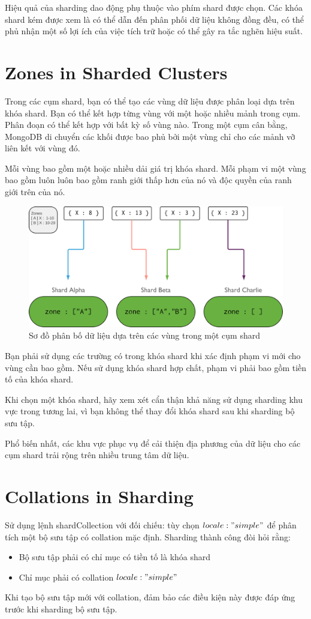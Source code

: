 Hiệu quả của sharding dao động phụ thuộc vào phím shard được chọn. Các khóa shard kém được xem là có thể dẫn đến phân phối dữ liệu không đồng đều, có thể phủ nhận một số lợi ích của việc tích trữ hoặc có thể gây ra tắc nghẽn hiệu suất.

\section{Zones in Sharded Clusters}
Trong các cụm shard, bạn có thể tạo các vùng dữ liệu được phân loại dựa trên khóa shard. Bạn có thể kết hợp từng vùng với một hoặc nhiều mảnh trong cụm. Phân đoạn có thể kết hợp với bất kỳ số vùng nào. Trong một cụm cân bằng, MongoDB di chuyển các khối được bao phủ bởi một vùng chỉ cho các mảnh vỡ liên kết với vùng đó.

Mỗi vùng bao gồm một hoặc nhiều dải giá trị khóa shard. Mỗi phạm vi một vùng bao gồm luôn luôn bao gồm ranh giới thấp hơn của nó và độc quyền của ranh giới trên của nó.

\begin{figure}[h!]
\centering
\captionsetup{justification=centering,margin=1cm}
  	\includegraphics[scale=0.5]{charts/sharded-cluster-zones.png}
  \caption{Sơ đồ phân bố dữ liệu dựa trên các vùng trong một cụm shard}
  \end{figure}

Bạn phải sử dụng các trường có trong khóa shard khi xác định phạm vi mới cho vùng cần bao gồm. Nếu sử dụng khóa shard hợp chất, phạm vi phải bao gồm tiền tố của khóa shard. 

Khi chọn một khóa shard, hãy xem xét cẩn thận khả năng sử dụng sharding khu vực trong tương lai, vì bạn không thể thay đổi khóa shard sau khi sharding bộ sưu tập.

Phổ biến nhất, các khu vực phục vụ để cải thiện địa phương của dữ liệu cho các cụm shard trải rộng trên nhiều trung tâm dữ liệu.

\section{Collations in Sharding}
Sử dụng lệnh shardCollection với đối chiếu: tùy chọn ${locale: "simple"}$ để phân tích một bộ sưu tập có collation mặc định. Sharding thành công đòi hỏi rằng:
\begin{itemize}
\item Bộ sưu tập phải có chỉ mục có tiền tố là khóa shard
\item Chỉ mục phải có collation ${locale: "simple"}$
\end{itemize}
Khi tạo bộ sưu tập mới với collation, đảm bảo các điều kiện này được đáp ứng trước khi sharding bộ sưu tập.